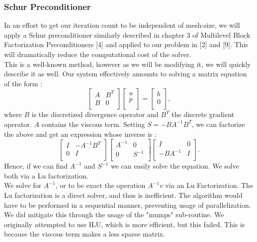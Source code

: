 \documentclass[11pt,twoside,a4paper]{article}
\begin{document}
\subsubsection{Schur Preconditioner}
In an effort to get our iteration count to be independent of mesh-size, we will apply a Schur preconditioner similarly described in chapter 3 of Multilevel Block Factorization Preconditioners [4] and applied to our problem in [2] and [9]. This will dramatically reduce the computational cost of the solver.\\
This is a well-known method, however as we will be modifying it, we will quickly describe it as well.
Our system effectively amounts to solving a matrix equation of the form :
$$
\begin{bmatrix}
A         & B^{T}\\
B         & 0 \\
\end{bmatrix}
\begin{bmatrix}
u    \\
p     \\
\end{bmatrix}
=
\begin{bmatrix}
b    \\
0     \\
\end{bmatrix} ,
$$
where $B$ is the discretized divergence operator and $B^T$ the discrete gradient operator. $A$ contains the viscous term.
Setting $S = - B A^{-1} B^{T}$, we can factorize the above and get an expression whose inverse is :
$$
\begin{bmatrix}
I         & - A^{-1} B^{T}\\
0         & I \\
\end{bmatrix}
\begin{bmatrix}
A^{-1}   & 0\\
0       & S^{-1} \\
\end{bmatrix}
\begin{bmatrix}
I & 0\\
 - B A^{-1}       & I \\
\end{bmatrix} .
$$
Hence, if we can find $A^{-1}$ and $S^{-1}$ we can easily solve the equation. We solve both via a Lu factorization.\\
We solve for $A^{-1}$, or to be exact the operation $A^{-1}v$ via an Lu Factorization. The Lu factorization is a direct solver, and thus is inefficient. The algorithm would have to be performed in a sequential manner, preventing usage of parallelization. We did mitigate this through the usage of the "mumps" sub-routine. We originally attempted to use ILU, which is more efficient, but this failed. This is because the viscous term makes a less sparse matrix.\\
\end{document}
